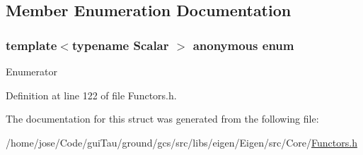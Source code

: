 \subsection{Member Enumeration Documentation}
\hypertarget{structei__functor__traits_3_01ei__scalar__difference__op_3_01_scalar_01_4_01_4_a1abde76977b528cb26e46c666d6e3c47}{\subsubsection[{anonymous enum}]{\setlength{\rightskip}{0pt plus 5cm}template$<$typename Scalar $>$ anonymous enum}}\label{structei__functor__traits_3_01ei__scalar__difference__op_3_01_scalar_01_4_01_4_a1abde76977b528cb26e46c666d6e3c47}
\begin{Desc}
\item[Enumerator]\par
\begin{description}
\item[{\em 
\hypertarget{structei__functor__traits_3_01ei__scalar__difference__op_3_01_scalar_01_4_01_4_a1abde76977b528cb26e46c666d6e3c47a78c883c6e5c52a4032c9f29279e0c9fa}{Cost}\label{structei__functor__traits_3_01ei__scalar__difference__op_3_01_scalar_01_4_01_4_a1abde76977b528cb26e46c666d6e3c47a78c883c6e5c52a4032c9f29279e0c9fa}
}]\end{description}
\end{Desc}


Definition at line 122 of file Functors.\-h.



The documentation for this struct was generated from the following file\-:\begin{DoxyCompactItemize}
\item 
/home/jose/\-Code/gui\-Tau/ground/gcs/src/libs/eigen/\-Eigen/src/\-Core/\hyperlink{_core_2_functors_8h}{Functors.\-h}\end{DoxyCompactItemize}
